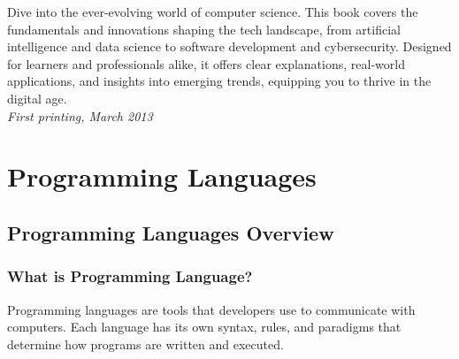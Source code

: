 \documentclass[openany]{book} %
\begin{document}
Dive into the ever-evolving world of computer science. This book covers the fundamentals and innovations shaping the tech landscape, from artificial intelligence and data science to software development and cybersecurity. Designed for learners and professionals alike, it offers clear explanations, real-world applications, and insights into emerging trends, equipping you to thrive in the digital age.\\%

\noindent \textit{First printing, March 2013} %




\pagestyle{empty} %

\tableofcontents %

\pagestyle{fancy} %


\part{Programming Languages}


\chapter{Programming Languages Overview}

\section{What is Programming Language?}

Programming languages are tools that developers use to communicate with computers. Each language has its own syntax, rules, and paradigms that determine how programs are written and executed.
\end{document}
